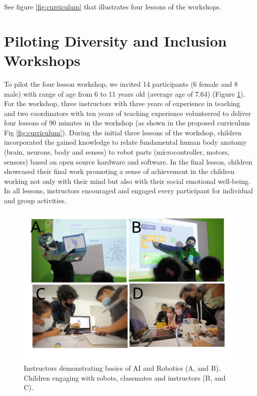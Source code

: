 \documentclass[conference]{IEEEtran}
\begin{document}
See figure \ref{fig:curriculum} that illustrates four lessons of the workshops.



\section{Piloting Diversity and Inclusion Workshops}
To pilot the four lesson workshop, we invited 14 participants (6 female and 8 male) with range of age from 6 to 11 years old (average age of 7.64) (Figure \ref{fig:pilot}). 
For the workshop, three instructors with three years of experience in teaching and two coordinators with ten years of teaching experience volunteered to deliver four lessons of 90 minutes in the workshop (as shown in the proposed curriculum Fig \ref{fig:curriculum}).
During the initial three lessons of the workshop, children incorporated the gained knowledge to relate fundamental human body anatomy (brain, neurons, body and senses) to robot parts (microcontroller, motors, sensors) based on open source hardware and software.
In the final lesson, children showcased their final work promoting a sense of achievement in the children working not only with their mind but also with their social emotional well-being. 
In all lessons, instructors encouraged and engaged every participant for individual and group activities.

\begin{figure}[tbp]
    \includegraphics[width=\linewidth]{piloting-workshops/versions/drawing-v00.png} %
    \caption{
        Instructors demonstrating basics of AI and Robotics (A, and B). 
        Children engaging with robots, classmates and instructors (B, and C).
        }
    \label{fig:pilot}
\end{figure}
\end{document}
